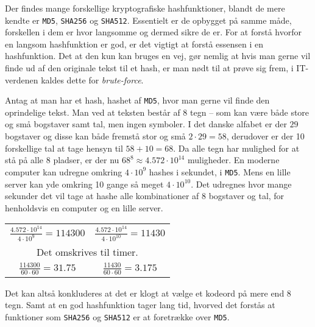     Der findes mange forskellige kryptografiske hashfunktioner, blandt de mere kendte er \texttt{MD5}, \texttt{SHA256} og \texttt{SHA512}.
    Essentielt er de opbygget på samme måde, forskellen i dem er hvor langsomme og dermed sikre de er.
    For at forstå hvorfor en langsom hashfunktion er god, er det vigtigt at forstå essensen i en hashfunktion.
    Det at den kun kan bruges en vej, gør nemlig at hvis man gerne vil finde ud af den originale tekst til et hash, er man nødt til at prøve sig frem, i IT-verdenen kaldes dette for \emph{brute-force}.


    \begin{eks}
        Antag at man har et hash, hashet af \texttt{MD5}, hvor man gerne vil finde den oprindelige tekst.
        Man ved at teksten består af 8 tegn -- som kan være både store og små bogstaver samt tal, men ingen symboler.
        I det danske alfabet er der \(29\) bogstaver og disse kan både fremstå stor og små \(2 \cdot 29 = 58\), derudover er der 10 forskellige tal at tage hensyn til \(58 + 10 = 68\).
        Da alle tegn har mulighed for at stå på alle 8 pladser, er der nu \(68^8\approx 4.572 \cdot 10^{14}\) muligheder.
        En moderne computer kan udregne omkring \(4 \cdot 10^9\) hashes i sekundet, i \texttt{MD5}.
        Mens en lille server kan yde omkring 10 gange så meget \(4 \cdot 10^{10}\).\cite{ytpwd}
        Det udregnes hvor mange sekunder det vil tage at hashe alle kombinationer af 8 bogstaver og tal, for henholdsvis en computer og en lille server.

        \setlength{\tabcolsep}{50pt} %
        \begin{center}
            \begin{tabular}{c c}

                \(\frac{4.572 \cdot 10^{14}}{4 \cdot 10^9} = 114300\) &
                \(\frac{4.572 \cdot 10^{14}}{4 \cdot 10^{10}} = 11430\)\\

                \multicolumn{2}{c}{Det omskrives til timer.}\\

                \(\frac{114300}{60 \cdot 60} = 31.75\) &
                \(\frac{11430}{60 \cdot 60} = 3.175\)\\

            \end{tabular}
        \end{center}

        \noindent
        Det kan altså konkluderes at det er klogt at vælge et kodeord på mere end 8 tegn.
        Samt at en god hashfunktion tager lang tid, hvorved det forstås at funktioner som \texttt{SHA256} og \texttt{SHA512} er at foretrække over \texttt{MD5}.

    \end{eks}





